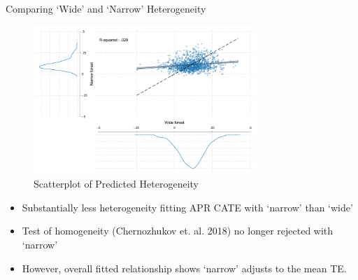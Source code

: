 \documentclass[8pt]{beamer}
\begin{document}
\begin{frame}{Comparing `Wide' and `Narrow' Heterogeneity}


    \label{wide_v_narrow}
    
        \begin{figure}
        \caption{Scatterplot of Predicted Heterogeneity}
        \centering
        \includegraphics[width=0.75\textwidth]{Figuras/scatter_hist_wide_narrow.pdf}
        \end{figure}

\begin{itemize}
    \item   Substantially less heterogeneity fitting APR CATE with `narrow' than `wide'
    \item Test of homogeneity (Chernozhukov et. al. 2018) no longer rejected with `narrow'
    \item   However, overall fitted relationship shows `narrow' adjusts to the mean TE.
\end{itemize}        


\end{frame}
\end{document}
